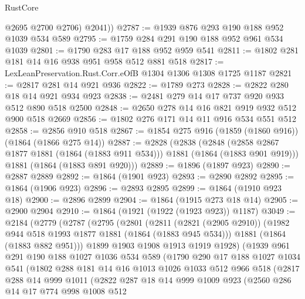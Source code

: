 \begin{lexlean}{RustCore}
\begin{coremodule}
          @2695
          @2700
          @2706)
        @2041))
@2787 := @1939 @876 @293 @190 @188 @952 @1039 @534 @589
@2795 := @1759 @284 @291 @190 @188 @952 @961 @534 @1039
@2801 := @1790 @283 @17 @188 @952 @959 @541
@2811 := @1802 @281 @181 @14 @16 @938 @951 @958 @512 @881 @518
@2817 := LexLeanPreservation.Rust.Corr.eOfB @1304 @1306 @1308 @1725 @1187
@2821 := @2817 @281 @14 @921 @936
@2822 := @1789 @273
@2828 := @2822 @280 @18 @14 @921 @934 @923
@2838 := @2481 @279 @14 @17 @737 @920 @933 @512 @890 @518 @2500
@2848 := @2650 @278 @14 @16 @821 @919 @932 @512 @900 @518 @2669
@2856 := @1802 @276 @171 @14 @11 @916 @534 @551 @512
@2858 := @2856 @910 @518
@2867 := @1854 @275 @916 (@1859 (@1860 @916)) (@1864 (@1866 @275 @14))
@2887 := @2828
    (@2838
      (@2848 (@2858 @2867 @1877 @1881 (@1864 (@1883 @911 @534))) @1881 (@1864 (@1883 @901 @919)))
      @1881
      (@1864 (@1883 @891 @920)))
@2889 := @1896 (@1897 @923)
@2890 := @2887 @2889
@2892 := @1864 (@1901 @923)
@2893 := @2890 @2892
@2895 := @1864 (@1906 @923)
@2896 := @2893 @2895
@2899 := @1864 (@1910 @923 @18)
@2900 := @2896 @2899
@2904 := @1864 (@1915 @273 @18 @14)
@2905 := @2900 @2904
@2910 := @1864 (@1921 (@1922 (@1923 @923)) @1187)
@3049 := @2184
    (@2779
      (@2787
        (@2795
          (@2801
            (@2811
              (@2821 (@2905 @2910))
              (@1982 @944 @518 @1993 @1877 @1881 (@1864 (@1883 @945 @534)))
              @1881
              (@1864 (@1883 @882 @951)))
            @1899
            @1903
            @1908
            @1913
            @1919
            @1928)
          (@1939
            @961
            @291
            @190
            @188
            @1027
            @1036
            @534
            @589
            (@1790
              @290
              @17
              @188
              @1027
              @1034
              @541
              (@1802
                @288
                @181
                @14
                @16
                @1013
                @1026
                @1033
                @512
                @966
                @518
                (@2817
                  @288
                  @14
                  @999
                  @1011
                  (@2822
                    @287
                    @18
                    @14
                    @999
                    @1009
                    @923
                    (@2560
                      @286
                      @14
                      @17
                      @774
                      @998
                      @1008
                      @512

\end{coremodule}
\end{lexlean}
